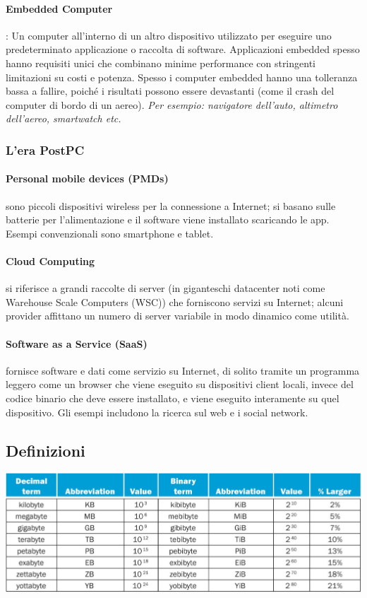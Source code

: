 \documentclass[12pt,a4paper]{article}
\begin{document}
\paragraph{Embedded Computer}: Un computer all'interno di un altro dispositivo utilizzato per eseguire uno predeterminato
applicazione o raccolta di software. Applicazioni embedded spesso hanno requisiti unici che combinano minime performance con stringenti limitazioni su costi e potenza. Spesso i computer embedded hanno una tolleranza bassa a fallire, poiché i risultati possono essere devastanti (come il crash del computer di bordo di un aereo). \textsl{Per esempio: navigatore dell'auto, altimetro dell'aereo, smartwatch etc.}

\subsubsection{L'era PostPC}
\paragraph{Personal mobile devices (PMDs)} sono piccoli dispositivi wireless per la connessione a Internet; si basano sulle batterie per l'alimentazione e il software viene installato scaricando le app. Esempi convenzionali sono smartphone e tablet.\\
\paragraph{Cloud Computing} si riferisce a grandi raccolte di server (in giganteschi datacenter noti come Warehouse Scale Computers (WSC)) che forniscono servizi su Internet; alcuni provider affittano un numero di server variabile in modo dinamico come utilità.\\
\paragraph{Software as a Service (SaaS)} fornisce software e dati come servizio su Internet, di solito tramite un programma leggero come un browser che viene eseguito su dispositivi client locali, invece del codice binario che deve essere installato, e viene eseguito interamente su quel dispositivo. Gli esempi includono la ricerca sul web e i social network.

\subsection{Definizioni}
\begin{center}
\includegraphics[width=1\columnwidth]{img/byte.png}
\end{center}
\end{document}
